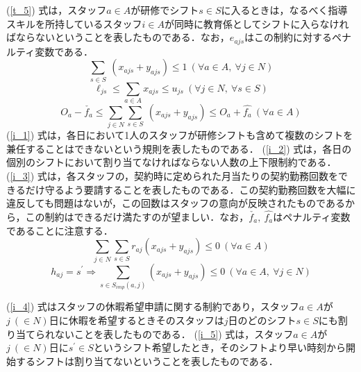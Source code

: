 \documentclass[11pt]{jsarticle}
\begin{document}
(\ref{t_5}) 式は，スタッフ$a \in A$が研修でシフト$s \in S$に入るときは，なるべく指導スキルを所持しているスタッフ$i \in A$が同時に教育係としてシフトに入らなければならないということを表したものである．なお，$e_{ajs}$はこの制約に対するペナルティ変数である．
\begin{equation}
\sum_{s \in S} \ (x_{ajs} + y_{ajs}) \leq 1 \ (\forall a \in A, \ \forall j \in N)
\label{i_1}
\end{equation}
\begin{equation}
\ell_{js} \leq \sum_{a \in A} x_{ajs} \leq u_{js} \ (\forall j \in N, \ \forall s \in S)
\label{i_2}
\end{equation}
\begin{equation}
O_a - \check{f_a} \leq \sum_{j \in N}\sum_{s \in S} \ (x_{ajs} + y_{ajs}) \leq O_a + \hat{f_a} \ (\forall a \in A)
\label{i_3}
\end{equation}
(\ref{i_1}) 式は，各日において1人のスタッフが研修シフトも含めて複数のシフトを兼任することはできないという規則を表したものである． (\ref{i_2}) 式は，各日の個別のシフトにおいて割り当てなければならない人数の上下限制約である． (\ref{i_3}) 式は，各スタッフの，契約時に定められた月当たりの契約勤務回数をできるだけ守るよう要請することを表したものである．この契約勤務回数を大幅に違反しても問題はないが，この回数はスタッフの意向が反映されたものであるから，この制約はできるだけ満たすのが望ましい．なお，$ \check{f_a}, \  \hat{f_a} $はペナルティ変数であることに注意する．
\begin{equation}
\sum_{j \in N}\sum_{s \in S}r_{aj} (x_{ajs} + y_{ajs}) \leq 0 \ (\forall a \in A)
\label{i_4}
\end{equation}
\begin{equation}
h_{aj} = s^{\prime} \Rightarrow \sum_{s \in S_{imp}(a, j)} (x_{ajs} + y_{ajs}) \leq 0 \ (\forall a \in A, \ \forall j \in N)
\label{i_5}
\end{equation}

(\ref{i_4}) 式はスタッフの休暇希望申請に関する制約であり，スタッフ$a \in A$が$j \ (\in N)$日に休暇を希望するときそのスタッフは$j$日のどのシフト$s \in S$にも割り当てられないことを表したものである． (\ref{i_5}) 式は，スタッフ$a \in A$が$j \ (\in N)$日に$s^{\prime} \in S$というシフト希望したとき，そのシフトより早い時刻から開始するシフトは割り当てないということを表したものである．

\vspace{\baselineskip}
\end{document}
